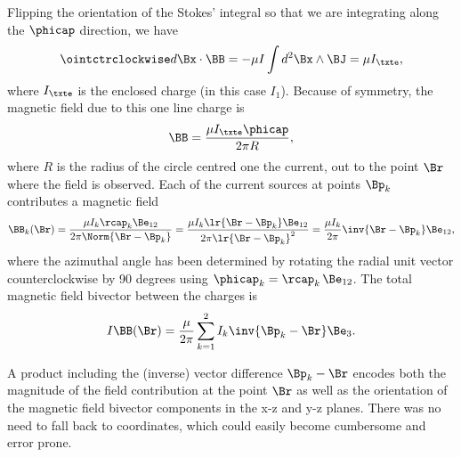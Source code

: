 Flipping the orientation of the Stokes' integral so that we are integrating along the \( \phicap \) direction, we have
\begin{dmath}\label{eqn:amperesLawMagnetostaticsExample:40}
\ointctrclockwise d\Bx \cdot \BB
= -\mu I \int d^2 \Bx \wedge \BJ
= \mu I_\txte,
\end{dmath}
where \( I_\txte \) is the enclosed charge (in this case \( I_1 \)).
Because of symmetry, the magnetic field due to this one line charge is
\begin{dmath}\label{eqn:amperesLawMagnetostaticsExample:60}
\BB
= \frac{\mu I_\txte \phicap}{2 \pi R},
\end{dmath}
where \( R \) is the radius of the circle centred one the current, out to the point \( \Br \) where the field is observed.
Each of the current sources at points \( \Bp_k \) contributes a magnetic field
\begin{dmath}\label{eqn:amperesLawMagnetostaticsExample:80}
\BB_k(\Br)
= \frac{\mu I_k \rcap_k \Be_{12} }{2 \pi \Norm{ \Br - \Bp_k} }
= \frac{\mu I_k \lr{ \Br - \Bp_k} \Be_{12} }{2 \pi \lr{ \Br - \Bp_k}^2 }
= \frac{\mu I_k}{2\pi} \inv{ \Br - \Bp_k} \Be_{12},
\end{dmath}
where the azimuthal angle has been determined by rotating the radial unit vector counterclockwise by 90 degrees using \( \phicap_k = \rcap_k\, \Be_{12} \).
The total magnetic field bivector between the charges is
\begin{equation}\label{eqn:amperesLawMagnetostaticsExample:100}
I \BB(\Br)
= \frac{\mu}{2\pi} \sum_{k = 1}^2 I_k \inv{\Bp_k - \Br } \Be_3.
\end{equation}

A product including the (inverse) vector difference \( \Bp_k - \Br \) encodes both the magnitude of the field contribution at the point \( \Br \) as well as the orientation of the magnetic field bivector components in the x-z and y-z planes.
There was no need to fall back to coordinates, which could easily become cumbersome and error prone.
